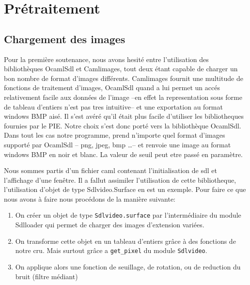 \documentclass[]{report}
\begin{document}
      



	\chapter{Pr\'etraitement} %
	\label{cha:pr'etraitement}
        \section{Chargement des images} %
        Pour la première soutenance, nous avons hesité entre l'utilisation des bibliothèques OcamlSdl et Camlimages, tout deux étant
        capable de charger un bon nombre de format d'images différents. Camlimages fournit une multitude de fonctions de traitement
        d'images, OcamlSdl quand a lui permet un accés relativement facile aux données de l'image --en effet la representation sous
        forme de tableau d'entiers n'est pas tres intuitive-- et une exportation au format windows BMP aisé.
        Il s'est avéré qu'il était plus facile d'utiliser les bibliotheques fournies par le PIE. Notre choix s'est donc porté vers
        la bibliothèque OcamlSdl.
        Dans tout les cas notre programme, prend n'importe quel format d'images supporté par OcamlSdl -- png, jpeg, bmp \ldots--
        et renvoie une image au format windows BMP en noir et blanc. La valeur de seuil peut etre passé en paramètre.

        \label{sec:Ocamlsdl}
        Nous sommes partis d'un fichier caml contenant l'initialisation de sdl et l'affichage d'une fenêtre. Il a fallut assimiler
        l'utilisation de cette bibliotheque, l'utilisation d'objet de type Sdlvideo.Surface en est un exemple. Pour faire ce que
        nous avons à faire nous procédons de la manière suivante:
        \begin{enumerate}
          \item On créer un objet de type \verb!Sdlvideo.surface! par l'intermédiaire du module Sdlloader qui permet de charger des
            images d'extension variées.
          \item On transforme cette objet en un tableau d'entiers grâce à des fonctions de notre cru. Mais surtout grâce a \verb!get_pixel! du module \verb!Sdlvideo!.
          \item On applique alors une fonction de seuillage, de rotation, ou de reduction du bruit (filtre médiant)
        \end{enumerate}
\end{document}
